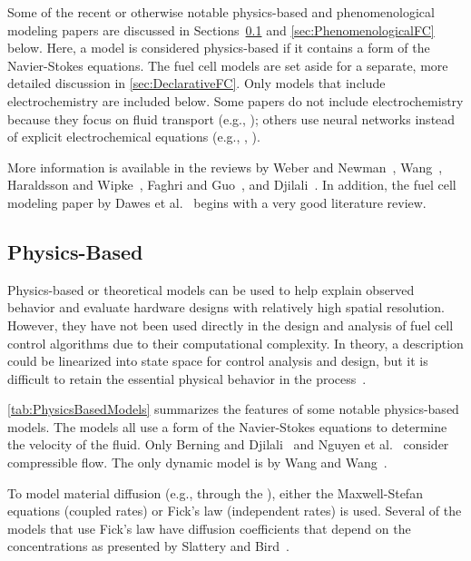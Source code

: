 Some of the recent or otherwise notable physics-based and phenomenological modeling papers are discussed in Sections~\ref{sec:PhysicsBasedFC} and \ref{sec:PhenomenologicalFC} below.  Here, a model is considered physics-based if it contains a form of the Navier-Stokes equations.  The  fuel cell models are set aside for a separate, more detailed discussion in \autoref{sec:DeclarativeFC}.  Only models that include electrochemistry are included below.  Some papers do not include electrochemistry because they focus on fluid transport (e.g., \cite{Mennola2003}); others use neural networks instead of explicit electrochemical equations (e.g., \cite{Jemei2003}, \cite{Lee2004}).

More information is available in the reviews by Weber and Newman~\cite{Weber2004ChemRev}, Wang~\cite{Wang2004}, Haraldsson and Wipke~\cite{Haraldsson2004}, Faghri and Guo~\cite{Faghri2005}, and Djilali~\cite{Djilali2007}.  In addition, the fuel cell modeling paper by Dawes et al.~\cite{Dawes2009} begins with a very good literature review.  



\subsection{Physics-Based}
\label{sec:PhysicsBasedFC}

Physics-based or theoretical models can be used to help explain observed behavior and evaluate hardware designs with relatively high spatial resolution.  However, they have not been used directly in the design and analysis of fuel cell control algorithms due to their computational complexity.  In theory, a  description could be linearized into state space for control analysis and design, but it is difficult to retain the essential physical behavior in the process~\cite{Gratton2004}.

\autoref{tab:PhysicsBasedModels} summarizes the features of some notable physics-based  models.  The models all use a form of the Navier-Stokes equations to determine the velocity of the fluid.  Only Berning and Djilali~\cite{Berning2003} and Nguyen et al.~\cite{Nguyen2004} consider compressible flow.  The only dynamic model is by Wang and Wang~\cite{Wang2006}.

To model material diffusion (e.g., through the ), either the Maxwell-Stefan equations (coupled rates) or Fick's law (independent rates) is used.  Several of the models that use Fick's law have diffusion coefficients that depend on the concentrations as presented by Slattery and Bird~\cite{Slattery1958}.

